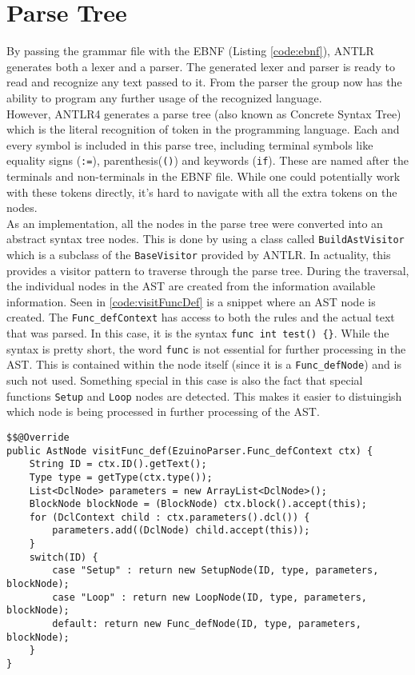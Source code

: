 \section{Parse Tree}
By passing the grammar file with the EBNF (Listing \ref{code:ebnf}), ANTLR generates both a lexer and a parser. The generated lexer and parser is ready to read and recognize any text passed to it. From the parser the group now has the ability to program any further usage of the recognized language.
\\
However, ANTLR4 generates a parse tree (also known as Concrete Syntax Tree) which is the literal recognition of token in the programming language. Each and every symbol is included in this parse tree, including terminal symbols like equality signs (\texttt{:=}), parenthesis(\texttt{()}) and keywords (\texttt{if}). These are named after the terminals and non-terminals in the EBNF file. While one could potentially work with these tokens directly, it's hard to navigate with all the extra tokens on the nodes.
\\
As an implementation, all the nodes in the parse tree were converted into an abstract syntax tree nodes. This is done by using a class called \texttt{BuildAstVisitor} which is a subclass of the \texttt{BaseVisitor} provided by ANTLR. In actuality, this provides a visitor pattern to traverse through the parse tree. During the traversal, the individual nodes in the AST are created from the information available information.
Seen in \ref{code:visitFuncDef} is a snippet where an AST node is created. The \texttt{Func\_defContext} has access to both the rules and the actual text that was parsed. In this case, it is the syntax
\texttt{func int test() \{\}}. While the syntax is pretty short, the word \texttt{func} is not essential for further processing in the AST. This is contained within the node itself (since it is a \texttt{Func\_defNode}) and is such not used. Something special in this case is also the fact that special functions \texttt{Setup} and \texttt{Loop} nodes are detected. This makes it easier to distuingish which node is being processed in further processing of the AST.
\\
\begin{lstlisting}[caption={Visit method for \texttt{Func\_defContext} in \texttt{AstBuildVisitor}}, label={code:visitFuncDef}]
$$@Override
public AstNode visitFunc_def(EzuinoParser.Func_defContext ctx) {
    String ID = ctx.ID().getText();
    Type type = getType(ctx.type());
    List<DclNode> parameters = new ArrayList<DclNode>();
    BlockNode blockNode = (BlockNode) ctx.block().accept(this);
    for (DclContext child : ctx.parameters().dcl()) {
        parameters.add((DclNode) child.accept(this));
    }
    switch(ID) {
        case "Setup" : return new SetupNode(ID, type, parameters, blockNode);
        case "Loop" : return new LoopNode(ID, type, parameters, blockNode);
        default: return new Func_defNode(ID, type, parameters, blockNode);
    }
}
\end{lstlisting}